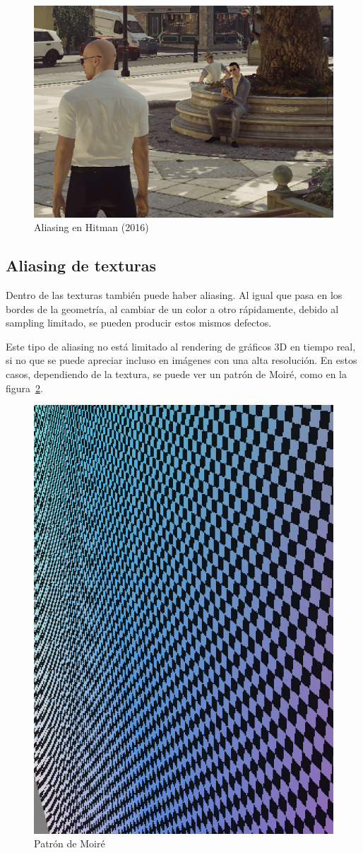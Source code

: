 \documentclass[withindex, glossary]{cam-thesis}
\begin{document}
\begin{figure}[!htbp]
    \includegraphics[width=.8\linewidth]{figures/hitmanaliasing.png}
    \caption{Aliasing en Hitman (2016)}
    \label{hitmanaliasing}
\end{figure}

\subsection{Aliasing de texturas}

Dentro de las texturas también puede haber aliasing. Al igual que pasa en los bordes de la geometría, al cambiar de un color a otro rápidamente, debido al sampling limitado, se pueden producir estos mismos defectos.

Este tipo de aliasing no está limitado al rendering de gráficos 3D en tiempo real, si no que se puede apreciar incluso en imágenes con una alta resolución. En estos casos, dependiendo de la textura, se puede ver un patrón de Moiré, como en la figura~\ref{moire}.

\begin{figure}[!htbp]
    \includegraphics[width=.3\linewidth]{figures/moire.png}
    \caption{Patrón de Moiré\cite{studysupersampling}}
    \label{moire}
\end{figure}
\end{document}
